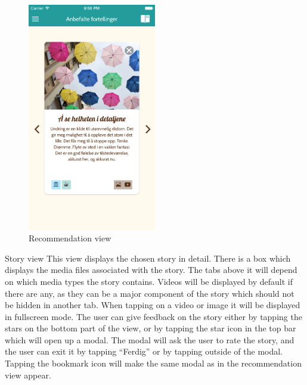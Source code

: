 \begin{figure}[h!]
	\centering
	\includegraphics[width=0.5\textwidth]{fig/recommendation_view}
	\caption{Recommendation view}
	\label{Fig:recommendation_view}
\end{figure}

Story view\newline
This view displays the chosen story in detail. There is a box which displays the media files associated with the story. The tabs above it will depend on which media types the story contains. Videos will be displayed by default if there are any, as they can be a major component of the story which should not be hidden in another tab. When tapping on a video or image it will be displayed in fullscreen mode. The user can give feedback on the story either by tapping the stars on the bottom part of the view, or by tapping the star icon in the top bar which will open up a modal. The modal will ask the user to rate the story, and the user can exit it by tapping “Ferdig” or by tapping outside of the modal. Tapping the bookmark icon will make the same modal as in the recommendation view appear.

